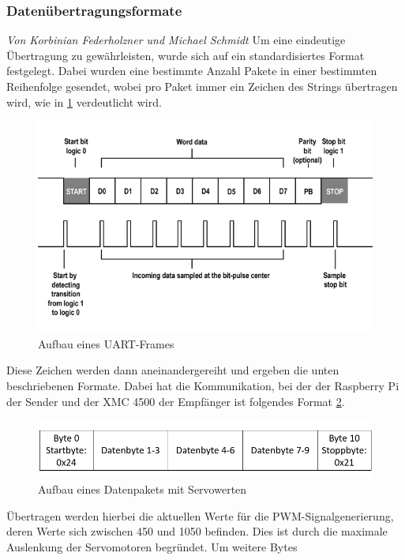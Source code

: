\documentclass[12pt,a4paper,bibliography=totoc,listof=totoc]{scrartcl}
\begin{document}
\subsubsection{Datenübertragungsformate}
\textit{Von Korbinian Federholzner und Michael Schmidt}\newline
Um eine eindeutige Übertragung zu gewährleisten, wurde sich auf ein standardisiertes Format festgelegt. 
Dabei wurden eine bestimmte Anzahl Pakete in einer bestimmten Reihenfolge gesendet, wobei pro Paket immer 
ein Zeichen des Strings übertragen wird, wie in \ref{fig:UARTFrame} \cite {electricimp} verdeutlicht wird.
\begin{figure}[htbp]
	\centering
	\includegraphics[scale = 0.5]{pics/Uartframe}
	\caption{Aufbau eines UART-Frames}
	\label{fig:UARTFrame}
\end{figure}
Diese Zeichen werden dann aneinandergereiht und ergeben die unten beschriebenen Formate. Dabei hat die 
Kommunikation, bei der der Raspberry Pi der Sender und der XMC 4500 der Empfänger ist folgendes Format 
\ref{fig:UART Servo}.
\begin{figure}[htbp]
	\centering
	\includegraphics[scale = 0.5]{pics/Uartservo}
	\caption{Aufbau eines Datenpakets mit Servowerten}
	\label{fig:UART Servo}
\end{figure}
Übertragen werden hierbei die aktuellen Werte für die PWM-Signalgenerierung, deren Werte sich zwischen 
450 und 1050 befinden. Dies ist durch die maximale Auslenkung der Servomotoren begründet. Um weitere Bytes 
\end{document}
